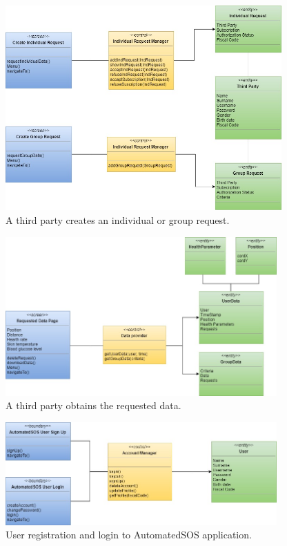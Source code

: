 \begin{figure}[ht]
    \centering
    \includegraphics[width=300pt]{images/BCE/BCE_Diagrams5.jpg}
    \caption{A third party creates an individual or group request.}
    \label{BCE5}
\end{figure}
\begin{figure}[ht]
    \centering
    \includegraphics[width=295pt]{images/BCE/BCE_Diagrams6.jpg}
    \caption{A third party obtains the requested data.}
    \label{BCE6}
\end{figure}
\begin{figure}[ht]
    \centering
    \includegraphics[width=295pt]{images/BCE/BCE_Diagrams7.jpg}
    \caption{User registration and login to AutomatedSOS application.}
    \label{BCE7}
\end{figure}

